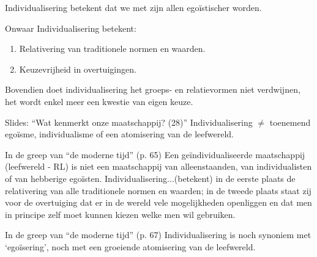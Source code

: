 \documentclass[main.tex]{subfiles}
\begin{document}
\begin{examenvraag}
    \begin{stelling}
        Individualisering betekent dat we met zijn allen egoïstischer worden.
    \end{stelling}

    \begin{stelling-antwoord}{Onwaar}
        Individualisering betekent:
        \begin{enumerate}
            \item Relativering van traditionele normen en waarden.
            \item Keuzevrijheid in overtuigingen.
        \end{enumerate}
        Bovendien doet individualisering het groeps-‭ ‬en relatievormen niet 
        verdwijnen,‭ ‬het wordt enkel meer een kwestie van eigen keuze.‭ 
        \begin{citaat}{Slides: ``Wat kenmerkt onze maatschappij? (28)''}
            Individualisering $\neq$ toenemend ego\"isme, individualisme of een atomisering van de leefwereld.
        \end{citaat}
        \begin{citaat}{In de greep van ``de moderne tijd'' (p. 65)}
            Een ge\"individualiseerde maatschappij (leefwereld - RL) is niet een maatschappij van alleenstaanden, van individualisten of van hebberige ego\"isten.
            Individualisering...(betekent) in de eerste plaats de relativering van alle traditionele normen en waarden; in de tweede plaats staat zij voor de overtuiging dat er in de wereld vele mogelijkheden openliggen en dat men in principe zelf moet kunnen kiezen welke men wil gebruiken.
        \end{citaat}
         \begin{citaat}{In de greep van ``de moderne tijd'' (p. 67)}
            Individualisering is noch synoniem met `ego\"isering', noch met een 
            groeiende atomisering van de leefwereld.
        \end{citaat}
    \end{stelling-antwoord}
\end{examenvraag}
\end{document}
